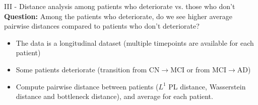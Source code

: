 \documentclass[aspectratio=169, 10pt, dvipsnames]{beamer}
\begin{document}
\begin{frame}[fragile]{III - Distance analysis among patients who deteriorate vs. those who don't}
\textbf{Question:} Among the patients who deteriorate, do we see higher average pairwise distances compared to patients who don't deteriorate?
  \begin{itemize}
  \item The data is a longitudinal dataset (multiple timepoints are available for each patient)
  \item Some patients deteriorate (transition from CN$\rightarrow$MCI or from MCI$\rightarrow$AD)
  \item Compute pairwise distance between patients ($L^1$ PL distance, Wasserstein distance and bottleneck distance), and average for each patient.
  \end{itemize}
\end{frame}
\end{document}
